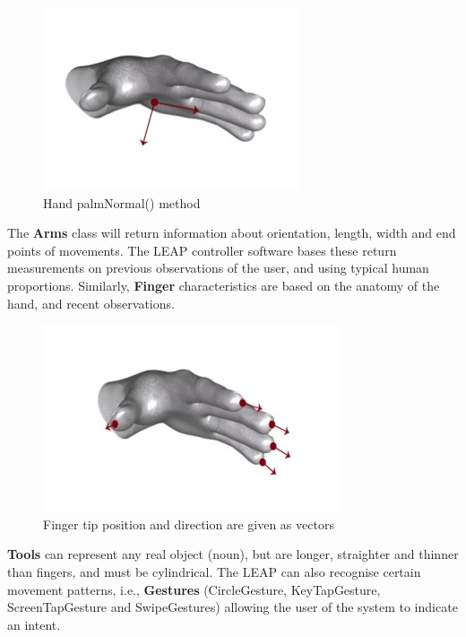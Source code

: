 \documentclass[a4paper, 10pt]{article}
\begin{document}
\begin{figure}[H]
\begin{center}
\includegraphics[scale=0.4]{palm}\\
Hand palmNormal() method \cite{leap}
\end{center}
\end{figure}

The \textbf{Arms} class will return information about orientation, length, width and end points of movements. The LEAP controller software bases these return measurements on previous observations of the user, and using typical human proportions. Similarly, \textbf{Finger} characteristics are based on the anatomy of the hand, and recent observations. 

\begin{figure}[H]
\begin{center}
\includegraphics[scale=0.4]{fingers}\\
Finger tip position and direction are given as vectors \cite{leap}
\end{center}
\end{figure}

\textbf{Tools} can represent any real object (noun), but are longer, straighter and thinner than fingers, and must be cylindrical. The LEAP can also recognise certain movement patterns, i.e., \textbf{Gestures} (CircleGesture, KeyTapGesture, ScreenTapGesture and SwipeGestures) allowing the user of the system to indicate an intent.
\end{document}
